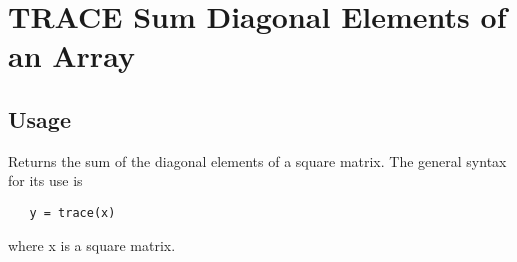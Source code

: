 \section{TRACE Sum Diagonal Elements of an Array}

\subsection{Usage}

 
 Returns the sum of the diagonal elements of a square matrix. The general
 syntax for its use is
\begin{verbatim}
   y = trace(x)
\end{verbatim}
 where x is a square matrix.
